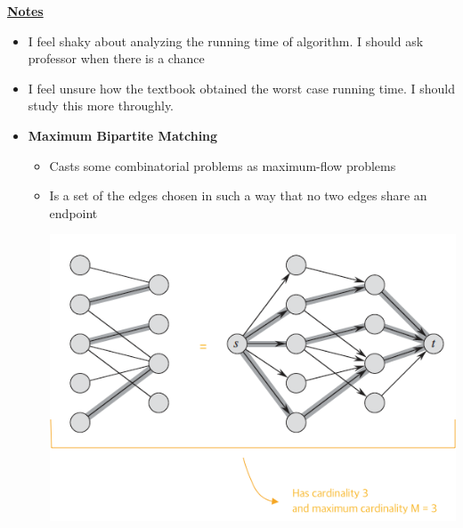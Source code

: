 \documentclass[12pt]{article}
\begin{document}
\begin{enumerate}[1.]
\begin{enumerate}[a)]











        \underline{\textbf{Notes}}

        \bigskip

        \begin{itemize}
            \item I feel shaky about analyzing the running time of algorithm. I should ask
            professor when there is a chance
            \item I feel unsure how the textbook obtained the worst case running time. I should study this more throughly.
            \item \textbf{Maximum Bipartite Matching}

            \begin{itemize}
                \item Casts some combinatorial problems as maximum-flow problems
                \item Is a set of the edges chosen in such a way that no two edges share an endpoint

                \begin{center}
                \includegraphics[width=0.7\linewidth]{images/worksheet_5_solution_33.png}
                \end{center}


\end{itemize}
\end{itemize}
\end{enumerate}
\end{enumerate}
\end{document}
